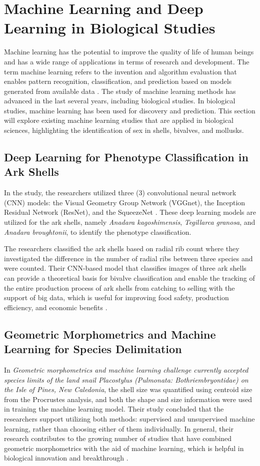 \section{Machine Learning and Deep Learning in Biological Studies}
Machine learning has the potential to improve the quality of life of human beings and has a wide range of applications in terms of research and development. The term machine learning refers to the invention and algorithm evaluation that enables pattern recognition, classification, and prediction based on models generated from available data \cite{tarca2007}. The study of machine learning methods has advanced in the last several years, including biological studies. In biological studies, machine learning has been used for discovery and prediction. This section will explore existing machine learning studies that are applied in biological sciences, highlighting the identification of sex in shells, bivalves, and mollusks.

\subsection{Deep Learning for Phenotype Classification in Ark Shells}
In the study, the researchers utilized three (3) convolutional neural network (CNN) models: the Visual Geometry Group Network (VGGnet), the Inception Residual Network (ResNet), and the SqueezeNet \cite{kim2024}. These deep learning models are utilized for the ark shells, namely \textit{Anadara kagoshimensis}, \textit{Tegillarca granosa}, and \textit{Anadara broughtonii}, to identify the phenotype classification. 

The researchers classified the ark shells based on radial rib count where they investigated the difference in the number of radial ribs between three species and were counted. Their CNN-based model that classifies images of three ark shells can provide a theoretical basis for bivalve classification and enable the tracking of the entire production process of ark shells from catching to selling with the support of big data, which is useful for improving food safety, production efficiency, and economic benefits \cite{kim2024}.

\subsection{Geometric Morphometrics and Machine Learning for Species Delimitation}
In \textit{Geometric morphometrics and machine learning challenge currently accepted species limits of the land snail Placostylus (Pulmonata: Bothriembryontidae) on the Isle of Pines, New Caledonia}, the shell size was quantified using centroid size from the Procrustes analysis, and both the shape and size information were used in training the machine learning model. Their study concluded that the researchers support utilizing both methods: supervised and unsupervised machine learning, rather than choosing either of them individually. In general, their research contributes to the growing number of studies that have combined geometric morphometrics with the aid of machine learning, which is helpful in biological innovation and breakthrough \cite{quenu2020}.


